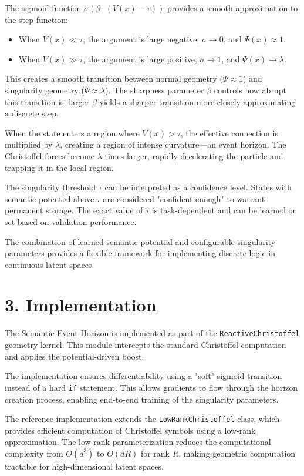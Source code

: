 \documentclass[12pt,letterpaper,twoside]{article}
\begin{document}
The sigmoid function $\sigma(\beta \cdot (V(x) - \tau))$ provides a smooth approximation to the step function:
\begin{itemize}
    \item When $V(x) \ll \tau$, the argument is large negative, $\sigma \to 0$, and $\Psi(x) \approx 1$.
    \item When $V(x) \gg \tau$, the argument is large positive, $\sigma \to 1$, and $\Psi(x) \to \lambda$.
\end{itemize}

This creates a smooth transition between normal geometry ($\Psi \approx 1$) and singularity geometry ($\Psi \approx \lambda$). The sharpness parameter $\beta$ controls how abrupt this transition is; larger $\beta$ yields a sharper transition more closely approximating a discrete step.

When the state enters a region where $V(x) > \tau$, the effective connection is multiplied by $\lambda$, creating a region of intense curvature—an event horizon. The Christoffel forces become $\lambda$ times larger, rapidly decelerating the particle and trapping it in the local region.

The singularity threshold $\tau$ can be interpreted as a confidence level. States with semantic potential above $\tau$ are considered "confident enough" to warrant permanent storage. The exact value of $\tau$ is task-dependent and can be learned or set based on validation performance.

The combination of learned semantic potential and configurable singularity parameters provides a flexible framework for implementing discrete logic in continuous latent spaces.

\section{3. Implementation}

The Semantic Event Horizon is implemented as part of the \texttt{ReactiveChristoffel} geometry kernel. This module intercepts the standard Christoffel computation and applies the potential-driven boost.

The implementation ensures differentiability using a "soft" sigmoid transition instead of a hard \texttt{if} statement. This allows gradients to flow through the horizon creation process, enabling end-to-end training of the singularity parameters.

The reference implementation extends the \texttt{LowRankChristoffel} class, which provides efficient computation of Christoffel symbols using a low-rank approximation. The low-rank parameterization reduces the computational complexity from $O(d^3)$ to $O(dR)$ for rank $R$, making geometric computation tractable for high-dimensional latent spaces.
\end{document}
